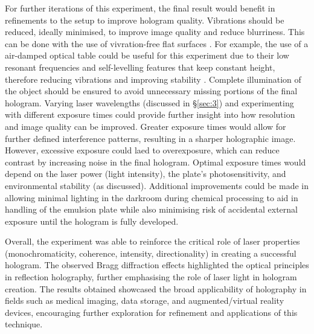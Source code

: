 \documentclass[12pt]{article}
\begin{document}
For further iterations of this experiment, the final result would benefit in refinements to the setup to improve hologram quality. Vibrations should be reduced, ideally minimised, to improve image quality and reduce blurriness. This can be done with the use of vivration-free flat surfaces \cite{UCDholo,princetonholo}.
For example, the use of a air-damped optical table could be useful for this experiment due to their low resonant frequencies and self-levelling features that keep constant height, therefore reducing vibrations and improving stability \cite{opticaltable}.
Complete illumination of the object should be ensured to avoid unnecessary missing portions of the final hologram. Varying laser wavelengths (discussed in §\ref{sec:3}) and experimenting with different exposure times could provide further insight into how resolution and image quality can be improved. Greater exposure times
would allow for further defined interference patterns, resulting in a sharper holographic image. However, excessive exposure could laed to overexposure, which can reduce contrast by increasing noise in the final hologram. Optimal exposure times would depend on the laser power (light intensity), the plate's photosensitivity, and environmental stability (as discussed).
Additional improvements could be made in allowing minimal lighting in the darkroom during chemical processing to aid in handling of the emulsion plate while also minimising risk of accidental external exposure until the hologram is fully developed.

Overall, the experiment was able to reinforce the critical role of laser properties (monochromaticity, coherence, intensity, directionality) in creating a successful hologram. The observed Bragg diffraction effects highlighted the
optical principles in reflection holography, further emphasising the role of laser light in hologram creation. The results obtained showcased the broad applicability of holography in fields such as medical imaging, data storage, and augmented/virtual reality devices, encouraging
further exploration for refinement and applications of this technique.

\newpage



 \label{sec:ref}

\vspace{1.5cm}

\listoffigures
\end{document}
